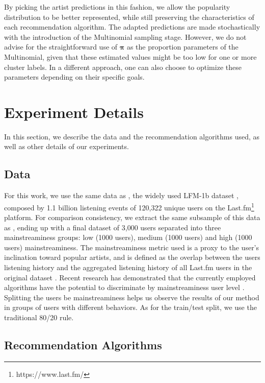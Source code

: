 \documentclass{article}
\begin{document}
By picking the artist predictions in this fashion, we 
allow the popularity distribution to be better represented, 
while still preserving the characteristics of each 
recommendation algorithm. The adapted predictions
are made stochastically with the introduction of 
the Multinomial sampling stage.
However, we
do not advise for the straightforward use of $\boldsymbol{\pi}$
as the proportion parameters of the Multinomial, given
that these estimated values might be too low for one or
more cluster labels. In a different
approach, one can also choose to optimize these parameters
depending on their specific goals. 



\section{Experiment Details}\label{sec:methods}

In this section, we describe the data and 
the recommendation algorithms used, as well as other details of our experiments. 

\subsection{Data}\label{sec:data}

For this work, we use the same data as \cite{pap_unfairness},
the widely used LFM-1b dataset \cite{lastfm}, 
composed by 1.1 billion listening events of 120,322 unique users
on the Last.fm\footnote{https://www.last.fm/} platform. For comparison consistency, 
we extract the same subsample of this data as
\cite{pap_unfairness}, ending up with a final dataset
of 3,000 users separated into three mainstreaminess groups:
low (1000 users), medium (1000 users) and high (1000 users)
mainstreaminess. The mainstreaminess metric used
is a proxy to the user's inclination toward popular
artists, and is defined  as the
overlap between the users listening history and 
the aggregated listening history of all Last.fm users
in the original dataset \cite{bauer2019global}. 
Recent research 
has demonstrated that the currently employed algorithms have the potential to 
discriminate by mainstreaminess user level \cite{van2013deep}.
Splitting the users be mainstreaminess
helps us observe the results of our method in 
groups of users with different behaviors. As for the train/test split, 
we use the traditional 80/20 rule. 



\subsection{Recommendation Algorithms}\label{sec:algorithms}
\end{document}
